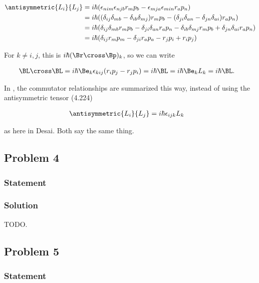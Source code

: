 \begin{align*}
\antisymmetric{L_i}{L_j}
&=
i \hbar ( \epsilon_{nim} \epsilon_{njb} r_m p_b - \epsilon_{mja} \epsilon_{min} r_a p_n ) \\
&=
i \hbar ( (\delta_{ij} \delta_{mb} -\delta_{ib} \delta_{mj}) r_m p_b - (\delta_{ji} \delta_{an} -\delta_{jn} \delta_{ai}) r_a p_n ) \\
&=
i \hbar (\delta_{ij} \delta_{mb} r_m p_b - \delta_{ji} \delta_{an} r_a p_n - \delta_{ib} \delta_{mj} r_m p_b + \delta_{jn} \delta_{ai} r_a p_n ) \\
&=
i \hbar (
\delta_{ij} r_m p_m
- \delta_{ji} r_a p_a
- r_j p_i
+ r_i p_j ) \\
\end{align*}

For $k \ne i,j$, this is $i\hbar (\Br \cross \Bp)_k$, so we can write

\begin{align}\label{eqn:desaiCh4:301}
\BL \cross \BL &= i\hbar \Be_k \epsilon_{kij} ( r_i p_j - r_j p_i ) = i\hbar \BL = i\hbar \Be_k L_k = i\hbar \BL.
\end{align}

In \citep{liboff2003iqm}, the commutator relationships are summarized this way, instead of using the antisymmetric tensor (4.224)

\begin{align}\label{eqn:desaiCh4:302}
\antisymmetric{L_i}{L_j} &= i \hbar \epsilon_{ijk} L_k
\end{align}

as here in Desai.  Both say the same thing.

\subsection{Problem 4}
\subsubsection{Statement}
\subsubsection{Solution}

TODO.
\subsection{Problem 5}
\subsubsection{Statement}

